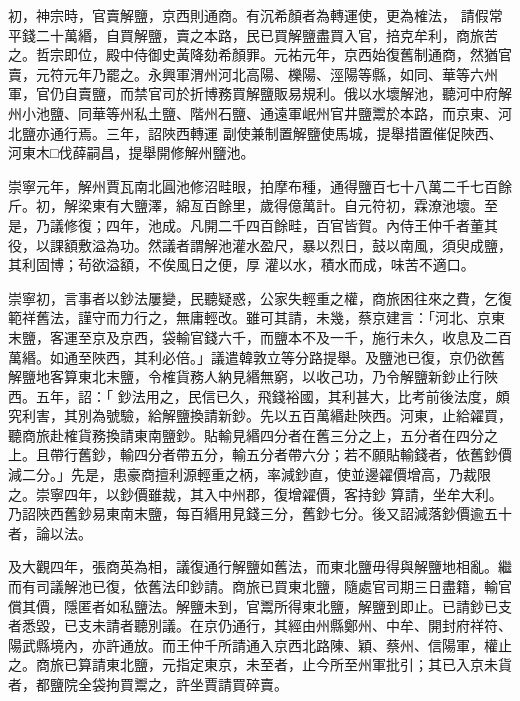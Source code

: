 \begin{pinyinscope}
 初，神宗時，官賣解鹽，京西則通商。有沉希顏者為轉運使，更為榷法，
 請假常平錢二十萬緡，自買解鹽，賣之本路，民已買解鹽盡買入官，掊克牟利，商旅苦之。哲宗即位，殿中侍御史黃降劾希顏罪。元祐元年，京西始復舊制通商，然猶官賣，元符元年乃罷之。永興軍渭州河北高陽、櫟陽、涇陽等縣，如同、華等六州軍，官仍自賣鹽，而禁官司於折博務買解鹽販易規利。俄以水壞解池，聽河中府解州小池鹽、同華等州私土鹽、階州石鹽、通遠軍岷州官井鹽鬻於本路，而京東、河北鹽亦通行焉。三年，詔陜西轉運
 副使兼制置解鹽使馬城，提舉措置催促陜西、河東木□伐薛嗣昌，提舉開修解州鹽池。



 崇寧元年，解州賈瓦南北圓池修沼畦眼，拍摩布種，通得鹽百七十八萬二千七百餘斤。初，解梁東有大鹽澤，綿亙百餘里，歲得億萬計。自元符初，霖潦池壞。至是，乃議修復；四年，池成。凡開二千四百餘畦，百官皆賀。內侍王仲千者董其役，以課額敷溢為功。然議者謂解池灌水盈尺，暴以烈日，鼓以南風，須臾成鹽，其利固博；茍欲溢額，不俟風日之便，厚
 灌以水，積水而成，味苦不適口。



 崇寧初，言事者以鈔法屢變，民聽疑惑，公家失輕重之權，商旅困往來之費，乞復範祥舊法，謹守而力行之，無庸輕改。雖可其請，未幾，蔡京建言：「河北、京東末鹽，客運至京及京西，袋輸官錢六千，而鹽本不及一千，施行未久，收息及二百萬緡。如通至陜西，其利必倍。」議遣韓敦立等分路提舉。及鹽池已復，京仍欲舊解鹽地客算東北末鹽，令榷貨務人納見緡無窮，以收己功，乃令解鹽新鈔止行陜西。五年，詔：「
 鈔法用之，民信已久，飛錢裕國，其利甚大，比考前後法度，頗究利害，其別為號驗，給解鹽換請新鈔。先以五百萬緡赴陜西。河東，止給糴買，聽商旅赴榷貨務換請東南鹽鈔。貼輸見緡四分者在舊三分之上，五分者在四分之上。且帶行舊鈔，輸四分者帶五分，輸五分者帶六分；若不願貼輸錢者，依舊鈔價減二分。」先是，患豪商擅利源輕重之柄，率減鈔直，使並邊糴價增高，乃裁限之。崇寧四年，以鈔價雖裁，其入中州郡，復增糴價，客持鈔
 算請，坐牟大利。乃詔陜西舊鈔易東南末鹽，每百緡用見錢三分，舊鈔七分。後又詔減落鈔價逾五十者，論以法。



 及大觀四年，張商英為相，議復通行解鹽如舊法，而東北鹽毋得與解鹽地相亂。繼而有司議解池已復，依舊法印鈔請。商旅已買東北鹽，隨處官司期三日盡籍，輸官償其價，隱匿者如私鹽法。解鹽未到，官鬻所得東北鹽，解鹽到即止。已請鈔已支者悉毀，已支未請者聽別議。在京仍通行，其經由州縣鄭州、中牟、開封府祥符、
 陽武縣境內，亦許通放。而王仲千所請通入京西北路陳、穎、蔡州、信陽軍，權止之。商旅已算請東北鹽，元指定東京，未至者，止今所至州軍批引；其已入京未貨者，都鹽院全袋拘買鬻之，許坐賈請買碎賣。




\end{pinyinscope}
